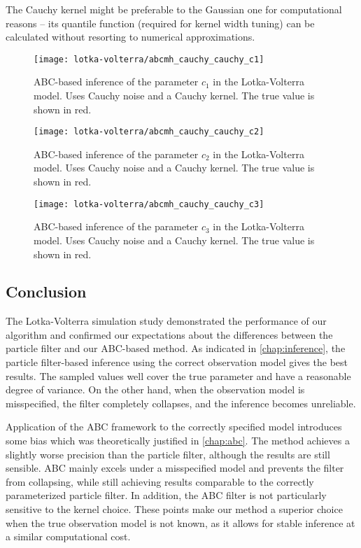 The Cauchy kernel might be preferable to the Gaussian one for computational reasons -- its quantile function (required for kernel width tuning) can be calculated without resorting to numerical approximations.

\begin{figure}[ht]
    \centering
    \texttt{[image: lotka-volterra/abcmh\_cauchy\_cauchy\_c1]}
    \caption{ABC-based inference of the parameter $c_1$ in the Lotka-Volterra model. Uses Cauchy noise and a Cauchy kernel. The true value is shown in red.}
    \label{fig:lv-abcmh-cauchy-cauchy-c1}
\end{figure}

\begin{figure}[ht]
    \centering
    \texttt{[image: lotka-volterra/abcmh\_cauchy\_cauchy\_c2]}
    \caption{ABC-based inference of the parameter $c_2$ in the Lotka-Volterra model. Uses Cauchy noise and a Cauchy kernel. The true value is shown in red.}
    \label{fig:lv-abcmh-cauchy-cauchy-c2}
\end{figure}

\begin{figure}[ht]
    \centering
    \texttt{[image: lotka-volterra/abcmh\_cauchy\_cauchy\_c3]}
    \caption{ABC-based inference of the parameter $c_3$ in the Lotka-Volterra model. Uses Cauchy noise and a Cauchy kernel. The true value is shown in red.}
    \label{fig:lv-abcmh-cauchy-cauchy-c3}
\end{figure}


\subsection{Conclusion}
The Lotka-Volterra simulation study demonstrated the performance of our algorithm and confirmed our expectations about the differences between the particle filter and our ABC-based method. As indicated in \autoref{chap:inference}, the particle filter-based inference using the correct observation model gives the best results. The sampled values well cover the true parameter and have a reasonable degree of variance. On the other hand, when the observation model is misspecified, the filter completely collapses, and the inference becomes unreliable.

Application of the ABC framework to the correctly specified model introduces some bias which was theoretically justified in \autoref{chap:abc}. The method achieves a slightly worse precision than the particle filter, although the results are still sensible. ABC mainly excels under a misspecified model and prevents the filter from collapsing, while still achieving results comparable to the correctly parameterized particle filter. In addition, the ABC filter is not particularly sensitive to the kernel choice. These points make our method a superior choice when the true observation model is not known, as it allows for stable inference at a similar computational cost.



